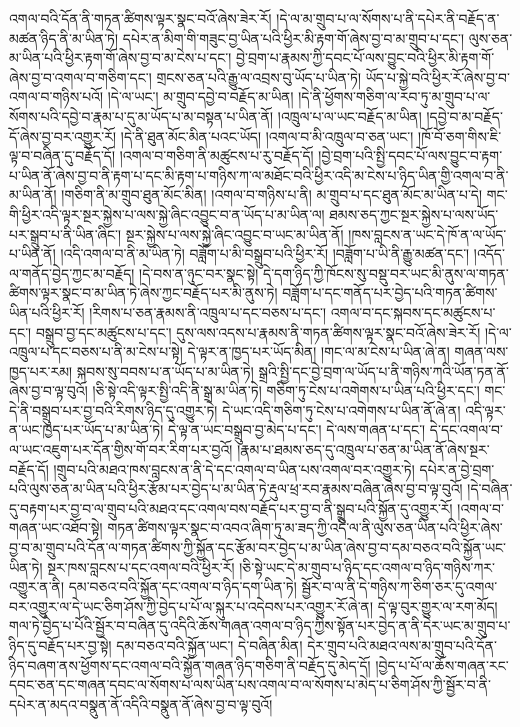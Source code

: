 འགལ་བའི་དོན་ནི་གཏན་ཚིགས་ལྟར་སྣང་བའོ་ཞེས་ཟེར་རོ། །དེ་ལ་མ་གྲུབ་པ་ལ་སོགས་པ་ནི་དཔེར་ནི་བརྗོད་ན་མཚན་ཉིད་ནི་མ་ཡིན་ཏེ། དཔེར་ན་མིག་གི་གཟུང་བྱ་ཡིན་པའི་ཕྱིར་མི་རྟག་གོ་ཞེས་བྱ་བ་མ་གྲུབ་པ་དང་། ལུས་ཅན་མ་ཡིན་པའི་ཕྱིར་རྟག་གོ་ཞེས་བྱ་བ་མ་ངེས་པ་དང་། བྱེ་བྲག་པ་རྣམས་ཀྱི་དབང་པོ་ལས་བྱུང་བའི་ཕྱིར་མི་རྟག་གོ་ཞེས་བྱ་བ་འགལ་བ་གཅིག་དང་། གྲངས་ཅན་པའི་རྒྱུ་ལ་འབྲས་བུ་ཡོད་པ་ཡིན་ཏེ། ཡོད་པ་སྐྱེ་བའི་ཕྱིར་རོ་ཞེས་བྱ་བ་འགལ་བ་གཉིས་པའོ། །དེ་ལ་ཡང་། མ་གྲུབ་དབྱེ་བ་བརྗོད་མ་ཡིན། །དེ་ནི་ཕྱོགས་གཅིག་ལ་རབ་ཏུ་མ་གྲུབ་པ་ལ་སོགས་པའི་དབྱེ་བ་རྣམ་པ་དུ་མ་ཡོད་པ་མ་བསྟན་པ་ཡིན་ནོ། །འཁྲུལ་པ་ལ་ཡང་བརྗོད་མ་ཡིན། །དབྱེ་བ་མ་བརྗོད་དོ་ཞེས་བྱ་བར་འགྱུར་རོ། །དེ་ནི་ཐུན་མོང་མིན་པའང་ཡོད། །འགལ་བ་མི་འཁྲུལ་བ་ཅན་ཡང་། །ཁོ་བོ་ཅག་གིས་ཇི་ལྟ་བ་བཞིན་དུ་བརྗོད་དོ། །འགལ་བ་གཅིག་ནི་མཚུངས་པ་རུ་བརྗོད་དོ། །བྱེ་བྲག་པའི་སྤྱི་དབང་པོ་ལས་བྱུང་བ་རྟག་པ་ཡིན་ནོ་ཞེས་བྱ་བ་ནི་རྟག་པ་དང་མི་རྟག་པ་གཉིས་ཀ་ལ་མཐོང་བའི་ཕྱིར་འདི་མ་ངེས་པ་ཉིད་ཡིན་གྱི་འགལ་བ་ནི་མ་ཡིན་ནོ། །གཅིག་ནི་མ་གྲུབ་ཐུན་མོང་མིན། །འགལ་བ་གཉིས་པ་ནི། མ་གྲུབ་པ་དང་ཐུན་མོང་མ་ཡིན་པ་དེ། གང་གི་ཕྱིར་འདི་ལྟར་སྔར་སྐྱེས་པ་ལས་སྐྱེ་ཞིང་འབྱུང་བ་ན་ཡོད་པ་མ་ཡིན་ལ། ཐམས་ཅད་ཀྱང་སྔར་སྐྱེས་པ་ལས་ཡོད་པར་སྒྲུབ་པ་ནི་ཡིན་ཞིང་། སྔར་སྐྱེས་པ་ལས་སྐྱེ་ཞིང་འབྱུང་བ་ཡང་མ་ཡིན་ནོ། །ཁས་བླངས་ན་ཡང་དེ་ཁོ་ན་ལ་ཡོད་པ་ཡིན་ནོ། །འདི་འགལ་བ་ནི་མ་ཡིན་ཏེ། བཟློག་པ་མི་བསྒྲུབ་པའི་ཕྱིར་རོ། །བཟློག་པ་ཡི་ནི་རྒྱུ་མཚན་དང་། །འདོད་ལ་གནོད་བྱེད་ཀྱང་མ་བརྗོད། །དེ་བས་ན་ཉུང་བར་སྣང་སྟེ། དེ་དག་ཉིད་ཀྱི་ཁོངས་སུ་བསྡུ་བར་ཡང་མི་ནུས་ལ་གཏན་ཚིགས་ལྟར་སྣང་བ་མ་ཡིན་ཏེ་ཞེས་ཀྱང་བརྗོད་པར་མི་ནུས་ཏེ། བཟློག་པ་དང་གནོད་པར་བྱེད་པའི་གཏན་ཚིགས་ཡིན་པའི་ཕྱིར་རོ། །རིགས་པ་ཅན་རྣམས་ནི་འཁྲུལ་པ་དང་བཅས་པ་དང་། འགལ་བ་དང་སྐབས་དང་མཚུངས་པ་དང་། བསྒྲུབ་བྱ་དང་མཚུངས་པ་དང་། དུས་ལས་འདས་པ་རྣམས་ནི་གཏན་ཚིགས་ལྟར་སྣང་བའོ་ཞེས་ཟེར་རོ། །དེ་ལ་འཁྲུལ་པ་དང་བཅས་པ་ནི་མ་ངེས་པ་སྟེ། དེ་ལྟར་ན་ཁྱད་པར་ཡོད་མིན། །གང་ལ་མ་ངེས་པ་ཡིན་ཞེ་ན། གཞན་ལས་ཁྱད་པར་རམ། སྐབས་སུ་བབས་པ་ན་ཡོད་པ་མ་ཡིན་ཏེ། སྒྲའི་སྤྱི་དང་བྱེ་བྲག་ལ་ཡོད་པ་ནི་གཉིས་ཀའི་ཡོན་ཏན་ནོ་ཞེས་བྱ་བ་ལྟ་བུའོ། །ཅི་སྟེ་འདི་ལྟར་སྤྱི་འདི་ནི་སྒྲ་མ་ཡིན་ཏེ། གཅིག་ཏུ་ངེས་པ་འགེགས་པ་ཡིན་པའི་ཕྱིར་དང་། གང་དེ་ནི་བསྒྲུབ་པར་བྱ་བའི་རིགས་ཉིད་དུ་འགྱུར་ཏེ། དེ་ཡང་འདི་གཅིག་ཏུ་ངེས་པ་འགེགས་པ་ཡིན་ནོ་ཞེ་ན། འདི་ལྟར་ན་ཡང་ཁྱད་པར་ཡོད་པ་མ་ཡིན་ཏེ། དེ་ལྟ་ན་ཡང་བསྒྲུབ་བྱ་མེད་པ་དང་། དེ་ལས་གཞན་པ་དང་། དེ་དང་འགལ་བ་ལ་ཡང་འཇུག་པར་དོན་གྱིས་གོ་བར་རིག་པར་བྱའོ། །རྣམ་པ་ཐམས་ཅད་དུ་འཁྲུལ་པ་ཅན་མ་ཡིན་ནོ་ཞེས་སྔར་བརྗོད་དོ། །གྲུབ་པའི་མཐའ་ཁས་བླངས་ན་ནི་དེ་དང་འགལ་བ་ཡིན་པས་འགལ་བར་འགྱུར་ཏེ། དཔེར་ན་བྱེ་བྲག་པའི་ལུས་ཅན་མ་ཡིན་པའི་ཕྱིར་རྩོམ་པར་བྱེད་པ་མ་ཡིན་ཏེ་རྡུལ་ཕྲ་རབ་རྣམས་བཞིན་ཞེས་བྱ་བ་ལྟ་བུའོ། །དེ་བཞིན་དུ་བརྟག་པར་བྱ་བ་ལ་གྲུབ་པའི་མཐའ་དང་འགལ་བས་བརྗོད་པར་བྱ་བ་ནི་སྒྲུབ་པའི་སྐྱོན་དུ་འགྱུར་རོ། །འགལ་བ་གཞན་ཡང་འཐོབ་སྟེ། གཏན་ཚིགས་ལྟར་སྣང་བ་འབའ་ཞིག་ཏུ་མ་ཟད་ཀྱི་འདི་ལ་ནི་ལུས་ཅན་ཡིན་པའི་ཕྱིར་ཞེས་བྱ་བ་མ་གྲུབ་པའི་དོན་ལ་གཏན་ཚིགས་ཀྱི་སྐྱོན་དང་རྩོམ་བར་བྱེད་པ་མ་ཡིན་ཞེས་བྱ་བ་དམ་བཅའ་བའི་སྐྱོན་ཡང་ཡིན་ཏེ། སྔར་ཁས་བླངས་པ་དང་འགལ་བའི་ཕྱིར་རོ། །ཅི་སྟེ་ཡང་དེ་མ་གྲུབ་པ་ཉིད་དང་འགལ་བ་ཉིད་གཉིས་ཀར་འགྱུར་ན་ནི། དམ་བཅའ་བའི་སྐྱོན་དང་འགལ་བ་ཉིད་དག་ཡིན་ཏེ། སྦྱོར་བ་ལ་ནི་དེ་གཉིས་ཀ་ཅིག་ཅར་དུ་འགལ་བར་འགྱུར་ལ་དེ་ཡང་ཅིག་ཤོས་ཀྱི་བྱེད་པ་པོ་ལ་སྐུར་པ་འདེབས་པར་འགྱུར་རོ་ཞེ་ན། དེ་ལྟ་བུར་གྱུར་ལ་རག་མོད། གལ་ཏེ་བྱེད་པ་པོའི་སྦྱོར་བ་བཞིན་དུ་འདིའི་ཆོས་གཞན་འགལ་བ་ཉིད་ཀྱིས་སྟོན་པར་བྱེད་ན་ནི་དེར་ཡང་མ་གྲུབ་པ་ཉིད་དུ་བརྗོད་པར་བྱ་སྟེ། དམ་བཅའ་བའི་སྐྱོན་ཡང་། དེ་བཞིན་མིན། དེར་གྲུབ་པའི་མཐའ་ལས་མ་གྲུབ་པའི་དོན་ཉིད་བཞག་ནས་ཕྱོགས་དང་འགལ་བའི་སྐྱོན་གཞན་ཉིད་གཅིག་ནི་བརྗོད་དུ་མེད་དོ། །བྱེད་པ་པོ་ལ་ཆོས་གཞན་རང་དབང་ཅན་དང་གཞན་དབང་ལ་སོགས་པ་ལས་ཡིན་པས་འགལ་བ་ལ་སོགས་པ་མེད་པ་ཅིག་ཤོས་ཀྱི་སྦྱོར་བ་ནི་དཔེར་ན་མདའ་བསྣུན་ནོ་འདིའི་བསྣུན་ནོ་ཞེས་བྱ་བ་ལྟ་བུའོ། 